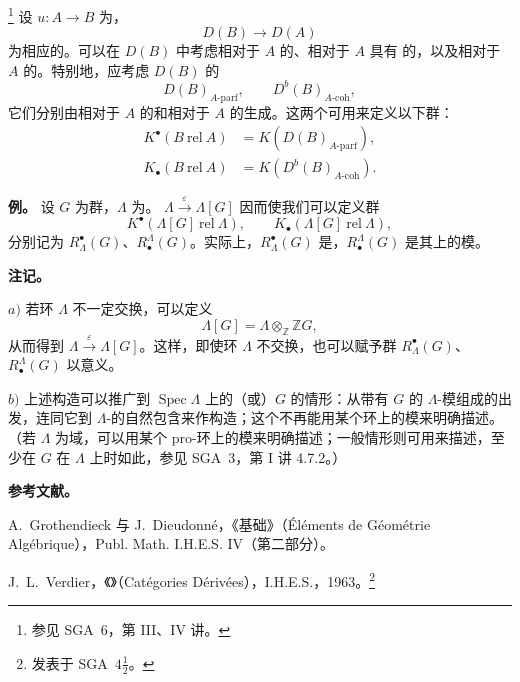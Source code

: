 \footnote{参见 SGA~6，第 III、IV 讲。}
设 $u:A\to B$ 为，
\[
D(B)\longrightarrow D(A)
\]
为相应的。可以在 $D(B)$ 中考虑相对于 $A$ 的、相对于 $A$ 具有 的，以及相对于 $A$ 的。特别地，应考虑 $D(B)$ 的
\[
D(B)_{A\text{-}\mathrm{parf}},\qquad D^b(B)_{A\text{-}\mathrm{coh}},
\]
它们分别由相对于 $A$ 的和相对于 $A$ 的生成。这两个可用来定义以下群：
\[
\begin{aligned}
K^\bullet(B\ \mathrm{rel}\ A)&=K(D(B)_{A\text{-}\mathrm{parf}}),\\
K_\bullet(B\ \mathrm{rel}\ A)&=K(D^b(B)_{A\text{-}\mathrm{coh}}).
\end{aligned}
\]

\textbf{例。} 设 $G$ 为群，$\Lambda$ 为。 $\Lambda\xrightarrow{\varepsilon}\Lambda[G]$ 因而使我们可以定义群
\[
K^\bullet(\Lambda[G]\ \mathrm{rel}\ \Lambda),\qquad
K_\bullet(\Lambda[G]\ \mathrm{rel}\ \Lambda),
\]
分别记为 $R^\bullet_\Lambda(G)$、$R^\Lambda_\bullet(G)$。实际上，$R^\bullet_\Lambda(G)$ 是，$R^\Lambda_\bullet(G)$ 是其上的模。

\textbf{注记。}

$a)$ 若环 $\Lambda$ 不一定交换，可以定义
\[
\Lambda[G]=\Lambda\otimes_{\mathbb Z}\mathbb ZG,
\]
从而得到 $\Lambda\xrightarrow{\varepsilon}\Lambda[G]$。这样，即使环 $\Lambda$ 不交换，也可以赋予群 $R^\bullet_\Lambda(G)$、$R^\Lambda_\bullet(G)$ 以意义。

$b)$ 上述构造可以推广到 $\operatorname{Spec}\Lambda$ 上的（或）$G$ 的情形：从带有 $G$ 的 $\Lambda$-模组成的出发，连同它到 $\Lambda$-的自然包含来作构造；这个不再能用某个环上的模来明确描述。（若 $\Lambda$ 为域，可以用某个 pro-环上的模来明确描述；一般情形则可用来描述，至少在 $G$ 在 $\Lambda$ 上时如此，参见 SGA~3，第 I 讲 4.7.2。）

\textbf{参考文献。}

\noindent [1]\quad A.~Grothendieck 与 J.~Dieudonné，《基础》（Éléments de Géométrie Algébrique），Publ. Math. I.H.E.S. IV（第二部分）。

\noindent [2]\quad J.~L.~Verdier，《》（Catégories Dérivées），I.H.E.S.，1963。\footnote{发表于 SGA~$4\frac12$。}
